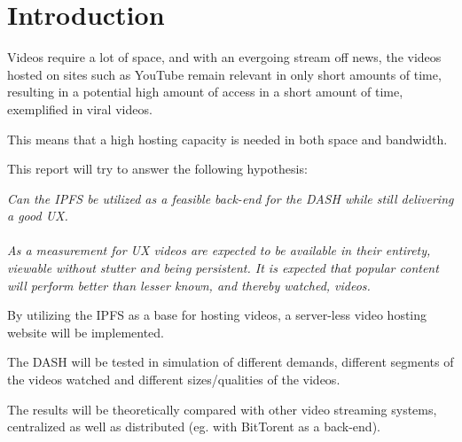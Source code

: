 \chapter{Introduction}
\label{cha:introduction}
Videos require a lot of space, and with an evergoing stream off news, the videos hosted on sites such as YouTube remain relevant in only short amounts of time, resulting in a potential high amount of access in a short amount of time, exemplified in viral videos.

This means that a high hosting capacity is needed in both space and bandwidth.

This report will try to answer the following hypothesis:

\begin{displayquote}
    \textit{
        Can the \acl{IPFS} be utilized as a feasible back-end for the \acl{DASH} while still delivering a good \acl{UX}. \\ \\
        As a measurement for \acl{UX} videos are expected to be available in their entirety, viewable without stutter and being persistent. It is expected that popular content will perform better than lesser known, and thereby watched, videos.
    }
\end{displayquote}

By utilizing the \ac{IPFS} as a base for hosting videos, a server-less video hosting website will be implemented.

The \ac{DASH} will be tested in simulation of different demands, different segments of the videos watched and different sizes/qualities of the videos.

The results will be theoretically compared with other video streaming systems, centralized as well as distributed (eg. with BitTorent as a back-end).

